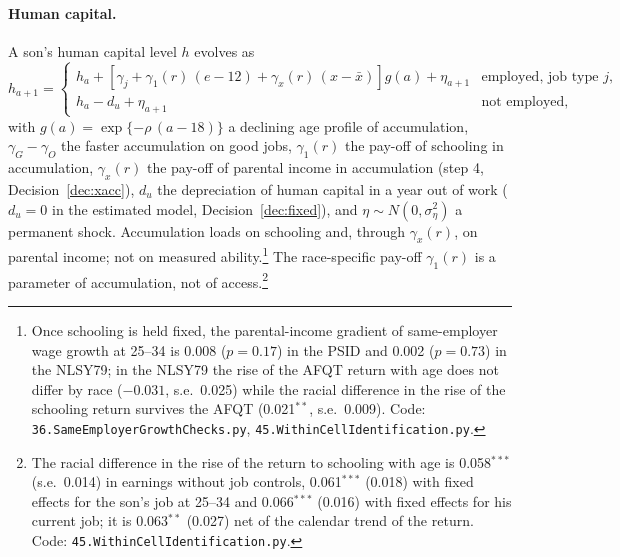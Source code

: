 \documentclass[11pt]{article}
\newcommand{\code}[1]{\texttt{#1}}
\newcommand{\1}{\mathbf{1}}
\begin{document}
\paragraph{Human capital.} A son's human capital level $h$ evolves as
\begin{equation}\label{eq:hc}
h_{a+1} = \begin{cases} h_a + \left[\gamma_j + \gamma_1(r)\, (e - 12) + \gamma_x(r)\, (x - \bar x)\right] g(a) +
\eta_{a+1} & \text{employed, job type } j, \\ h_a - d_u + \eta_{a+1} & \text{not employed,} \end{cases}
\end{equation}
with $g(a) = \exp\{-\rho\,(a - 18)\}$ a declining age profile of accumulation, $\gamma_G - \gamma_O$ the faster
accumulation on good jobs, $\gamma_1(r)$ the pay-off of schooling in accumulation, $\gamma_x(r)$ the pay-off of parental income in
accumulation (step 4, Decision~\ref{dec:xacc}), $d_u$ the depreciation of human capital in a year out of work ($d_u = 0$
in the estimated model, Decision~\ref{dec:fixed}), and $\eta \sim N(0, \sigma_\eta^2)$ a permanent shock. Accumulation loads on schooling and, through $\gamma_x(r)$, on parental income; not on measured ability.\footnote{Once schooling is held fixed, the parental-income gradient of
same-employer wage growth at 25--34 is 0.008 ($p=0.17$) in the PSID and 0.002 ($p=0.73$) in the NLSY79; in the NLSY79 the
rise of the AFQT return with age does not differ by race ($-0.031$, s.e.\ 0.025) while the racial difference in the rise
of the schooling return survives the AFQT (0.021$^{**}$, s.e.\ 0.009). Code: \code{36.SameEmployerGrowthChecks.py},
\code{45.WithinCellIdentification.py}.} The race-specific pay-off $\gamma_1(r)$ is a parameter of accumulation, not of
access.\footnote{The racial difference in the rise of the return to schooling with age is 0.058$^{***}$ (s.e.\ 0.014) in
earnings without job controls, 0.061$^{***}$ (0.018) with fixed effects for the son's job at 25--34 and 0.066$^{***}$
(0.016) with fixed effects for his current job; it is 0.063$^{**}$ (0.027) net of the calendar trend of the return.
Code: \code{45.WithinCellIdentification.py}.}
\end{document}
